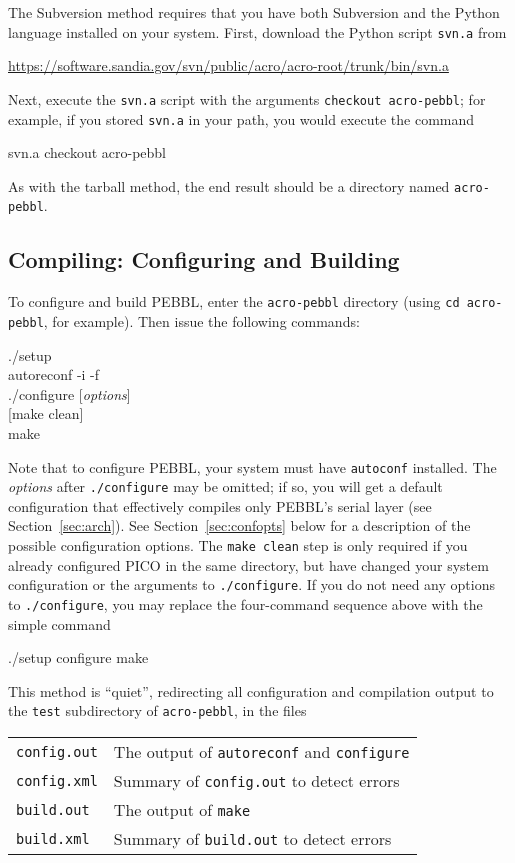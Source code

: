 The Subversion method requires that you have both Subversion and the
Python language installed on your system.  First, download the Python
script \texttt{svn.a} from
\begin{center}
\url{https://software.sandia.gov/svn/public/acro/acro-root/trunk/bin/svn.a}
\end{center}
Next, execute the \texttt{svn.a} script with the arguments
\texttt{checkout acro-pebbl}; for example, if you stored
\texttt{svn.a} in your path, you would execute the command
\begin{codeblock}
   svn.a checkout acro-pebbl
\end{codeblock}
As with the tarball method, the end result should be a directory named
\texttt{acro-pebbl}.


\subsection{Compiling: Configuring and Building}
\label{sec:compile}
\label{sec:compiling}
To configure and build PEBBL, enter the \texttt{acro-pebbl} directory
(using \texttt{cd acro-pebbl}, for example).  Then issue the
following commands:
\begin{codeblock}
./setup \\
autoreconf -i -f \\
./configure \textrm{[\emph{options}]} \\
\textrm{[}make clean\textrm{]} \\
make
\end{codeblock}
Note that to configure PEBBL, your system must have \texttt{autoconf}
installed.  The \emph{options} after \texttt{./configure} may be
omitted; if so, you will get a default configuration that effectively
compiles only PEBBL's serial layer (see Section~\ref{sec:arch}).  See
Section~\ref{sec:confopts} below for a description of the possible
configuration options.  The \texttt{make clean} step is only required
if you already configured PICO in the same directory, but have changed
your system configuration or the arguments to \texttt{./configure}.
If you do not need any options to \texttt{./configure}, you may
replace the four-command sequence above with the simple command
\begin{codeblock}
./setup configure make
\end{codeblock}
This method is ``quiet'', redirecting all configuration and
compilation output to the \texttt{test} subdirectory of
\texttt{acro-pebbl}, in the files
\begin{center}
\begin{tabular}{ll}
   \texttt{config.out} & The output of \texttt{autoreconf} 
                         and \texttt{configure} \\
   \texttt{config.xml} & Summary of \texttt{config.out} to detect errors\\
   \texttt{build.out} & The output of \texttt{make}\\
   \texttt{build.xml} & Summary of \texttt{build.out} to detect errors\\
\end{tabular}
\end{center}


